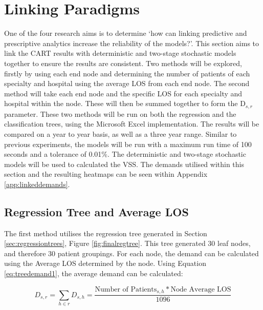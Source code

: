 \documentclass[../thesis.tex]{subfiles}
\begin{document}
\section{Linking Paradigms}\label{sec:linking}
One of the four research aims is to determine `how can linking predictive and prescriptive analytics increase the reliability of the models?'. This section aims to link the CART results with deterministic and two-stage stochastic models together to ensure the results are consistent. Two methods will be explored, firstly by using each end node and determining the number of patients of each specialty and hospital using the average LOS from each end node. The second method will take each end node and the specific LOS for each specialty and hospital within the node. These will then be summed together to form the D$_{s,r}$ parameter. These two methods will be run on both the regression and the classification trees, using the Microsoft Excel implementation. The results will be compared on a year to year basis, as well as a three year range. Similar to previous experiments, the models will be run with a maximum run time of 100 seconds and a tolerance of 0.01\%. The deterministic and two-stage stochastic models will be used to calculated the VSS. The demands utilised within this section and the resulting heatmaps can be seen within Appendix \ref{app:linkeddemands}.

\subsection{Regression Tree and Average LOS}
The first method utilises the regression tree generated in Section \ref{sec:regressiontrees}, Figure \ref{fig:finalregtree}. This tree generated 30 leaf nodes, and therefore 30 patient groupings. For each node, the demand can be calculated using the Average LOS determined by the node. Using Equation \eqref{eq:treedemand1}, the average demand can be calculated:

\begin{equation}\label{eq:treedemand1}
        D_{s,r} = \sum\limits_{h \in r} D_{s,h} = \frac{\text{Number of Patients}_{s,h}*\text{Node Average LOS}}{1096}
\end{equation}
\end{document}
